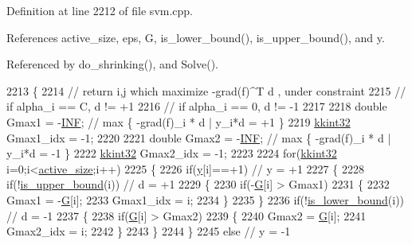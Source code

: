 Definition at line 2212 of file svm.\+cpp.



References active\+\_\+size, eps, G, is\+\_\+lower\+\_\+bound(), is\+\_\+upper\+\_\+bound(), and y.



Referenced by do\+\_\+shrinking(), and Solve().


\begin{DoxyCode}
2213 \{
2214   \textcolor{comment}{// return i,j which maximize -grad(f)^T d , under constraint}
2215   \textcolor{comment}{// if alpha\_i == C, d != +1}
2216   \textcolor{comment}{// if alpha\_i == 0, d != -1}
2217 
2218   \textcolor{keywordtype}{double} Gmax1 = -\hyperlink{svm_8cpp_a12c2040f25d8e3a7b9e1c2024c618cb6}{INF};  \textcolor{comment}{// max \{ -grad(f)\_i * d | y\_i*d = +1 \}}
2219   \hyperlink{namespace_k_k_b_a8fa4952cc84fda1de4bec1fbdd8d5b1b}{kkint32} Gmax1\_idx = -1;
2220 
2221   \textcolor{keywordtype}{double} Gmax2 = -\hyperlink{svm_8cpp_a12c2040f25d8e3a7b9e1c2024c618cb6}{INF};  \textcolor{comment}{// max \{ -grad(f)\_i * d | y\_i*d = -1 \}}
2222   \hyperlink{namespace_k_k_b_a8fa4952cc84fda1de4bec1fbdd8d5b1b}{kkint32} Gmax2\_idx = -1;
2223 
2224   \textcolor{keywordflow}{for}(\hyperlink{namespace_k_k_b_a8fa4952cc84fda1de4bec1fbdd8d5b1b}{kkint32} i=0;i<\hyperlink{class_s_v_m233_1_1_solver_aaa5d0e6b5e847cf0f05d5e5a44c96d1e}{active\_size};i++)
2225   \{
2226     \textcolor{keywordflow}{if}(\hyperlink{class_s_v_m233_1_1_solver_a17e4f05ccc46afc5b9bf686eac10928d}{y}[i]==+1)  \textcolor{comment}{// y = +1}
2227     \{
2228       \textcolor{keywordflow}{if}(!\hyperlink{class_s_v_m233_1_1_solver_a5a357c7baa23e6899939e3571284d652}{is\_upper\_bound}(i))  \textcolor{comment}{// d = +1}
2229       \{
2230         \textcolor{keywordflow}{if}(-\hyperlink{class_s_v_m233_1_1_solver_a429fc1d5724c8e7547e02b74cac19f40}{G}[i] > Gmax1)
2231         \{
2232           Gmax1 = -\hyperlink{class_s_v_m233_1_1_solver_a429fc1d5724c8e7547e02b74cac19f40}{G}[i];
2233           Gmax1\_idx = i;
2234         \}
2235       \}
2236       \textcolor{keywordflow}{if}(!\hyperlink{class_s_v_m233_1_1_solver_a4385cbb679a61f75e464f545e8f1b7b9}{is\_lower\_bound}(i))  \textcolor{comment}{// d = -1}
2237       \{
2238         \textcolor{keywordflow}{if}(\hyperlink{class_s_v_m233_1_1_solver_a429fc1d5724c8e7547e02b74cac19f40}{G}[i] > Gmax2)
2239         \{
2240           Gmax2 = \hyperlink{class_s_v_m233_1_1_solver_a429fc1d5724c8e7547e02b74cac19f40}{G}[i];
2241           Gmax2\_idx = i;
2242         \}
2243       \}
2244     \}
2245     \textcolor{keywordflow}{else}  \textcolor{comment}{// y = -1}

\end{DoxyCode}
